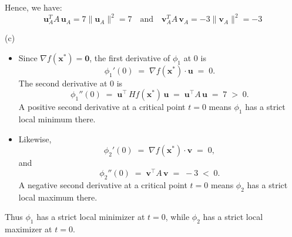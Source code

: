 \documentclass{article}
\begin{document}
Hence, we have:
\[
\mathbf{u}_A^T A \,\mathbf{u}_A = 7 \bigl\|\mathbf{u}_A\bigr\|^2 = 7 \quad \text{and} \quad \mathbf{v}_A^T A \,\mathbf{v}_A = -3 \bigl\|\mathbf{v}_A\bigr\|^2 = -3
\]

(c) \\

\begin{itemize}
\item Since \(\nabla f(\mathbf{x}^*) = \mathbf{0}\), the first derivative of \(\phi_1\) at \(0\) is
   \[
   \phi_1'(0)
   \;=\;
   \nabla f(\mathbf{x}^*) \cdot \mathbf{u} 
   \;=\; 0.
   \]
   The second derivative at \(0\) is
   \[
   \phi_1''(0)
   \;=\;
   \mathbf{u}^\top \,Hf(\mathbf{x}^*)\,\mathbf{u}
   \;=\;
   \mathbf{u}^\top A\,\mathbf{u}
   \;=\;
   7
   \;>\; 0.
   \]
   A positive second derivative at a critical point \(t = 0\) means \(\phi_1\) has a strict local minimum there.

\item Likewise,
   \[
   \phi_2'(0)
   \;=\;
   \nabla f(\mathbf{x}^*) \cdot \mathbf{v}
   \;=\; 0,
   \]
   and
   \[
   \phi_2''(0)
   \;=\;
   \mathbf{v}^\top A\,\mathbf{v}
   \;=\;
   -3 
   \;<\; 0.
   \]
   A negative second derivative at a critical point \(t = 0\) means \(\phi_2\) has a strict local maximum there.

\end{itemize}

Thus \(\phi_1\) has a strict local minimizer at \(t=0\), while \(\phi_2\) has a strict local maximizer at \(t=0\). 
\end{document}
